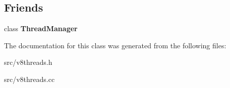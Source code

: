 \subsection*{Friends}
\begin{DoxyCompactItemize}
\item 
\hypertarget{classv8_1_1internal_1_1_thread_state_a2a28fc3c6cee05204a42286ac77ace1a}{}class {\bfseries Thread\+Manager}\label{classv8_1_1internal_1_1_thread_state_a2a28fc3c6cee05204a42286ac77ace1a}

\end{DoxyCompactItemize}


The documentation for this class was generated from the following files\+:\begin{DoxyCompactItemize}
\item 
src/v8threads.\+h\item 
src/v8threads.\+cc\end{DoxyCompactItemize}
